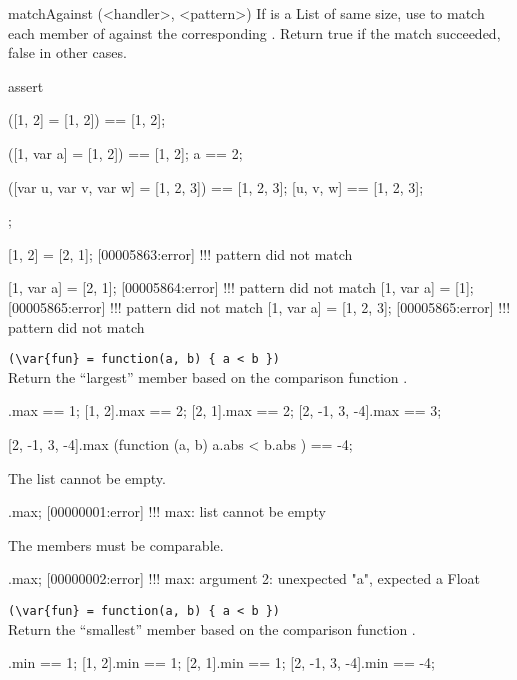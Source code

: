 \begin{urbiscriptapi}
\item[matchAgainst](<handler>, <pattern>)%
  If  is a List of same size, use  to match each
  member of \this against the corresponding .  Return true if
  the match succeeded, false in other cases.
\begin{urbiscript}
assert
{
  ([1, 2] = [1, 2]) == [1, 2];

  ([1, var a] = [1, 2]) == [1, 2];
  a == 2;

  ([var u, var v, var w] = [1, 2, 3]) == [1, 2, 3];
  [u, v, w] == [1, 2, 3];
};

[1, 2] = [2, 1];
[00005863:error] !!! pattern did not match

[1, var a] = [2, 1];
[00005864:error] !!! pattern did not match
[1, var a] = [1];
[00005865:error] !!! pattern did not match
[1, var a] = [1, 2, 3];
[00005865:error] !!! pattern did not match
\end{urbiscript}

\item {}\lstinline|(\var{fun} = function(a, b) { a < b })|\\%
  Return the ``largest'' member based on the comparison function .
\begin{urbiassert}
           [1].max == 1;
        [1, 2].max == 2;
        [2, 1].max == 2;
[2, -1, 3, -4].max == 3;

[2, -1, 3, -4].max (function (a, b) { a.abs < b.abs }) == -4;
\end{urbiassert}

The list cannot be empty.

\begin{urbiscript}
[].max;
[00000001:error] !!! max: list cannot be empty
\end{urbiscript}

The members must be comparable.
\begin{urbiscript}
[0, 2, "a", 1].max;
[00000002:error] !!! max: argument 2: unexpected "a", expected a Float
\end{urbiscript}

\item {}\lstinline|(\var{fun} = function(a, b) { a < b })|\\%
  Return the ``smallest'' member based on the comparison function .
\begin{urbiassert}
           [1].min == 1;
        [1, 2].min == 1;
        [2, 1].min == 1;
[2, -1, 3, -4].min == -4;


\end{urbiassert}
\end{urbiscriptapi}
